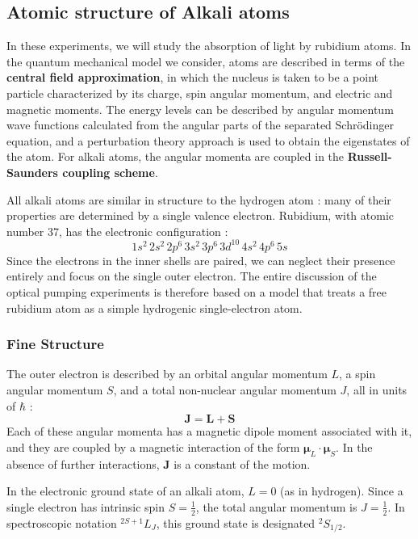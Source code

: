 \subsection{Atomic structure of Alkali atoms}
In these experiments, we will study the absorption of light by rubidium atoms. In the
quantum mechanical model we consider, atoms are described in terms of the
\textbf{central field approximation}, in which the nucleus is taken to be a point particle
characterized by its charge, spin angular momentum, and electric and magnetic moments.
The energy levels can be described by angular momentum wave functions calculated from
the angular parts of the separated Schr\"{o}dinger equation, and a perturbation theory
approach is used to obtain the eigenstates of the atom. For alkali atoms, the angular
momenta are coupled in the \textbf{Russell-Saunders coupling scheme}.
 
All alkali atoms are similar in structure to the hydrogen atom : many of their properties are
determined by a single valence electron. Rubidium, with atomic number 37, has the
electronic configuration :
\begin{equation}
    1s^2\,2s^2\,2p^6\,3s^2\,3p^6\,3d^{10}\,4s^2\,4p^6\,5s
\end{equation}
Since the electrons in the inner shells are paired, we can neglect their presence entirely and
focus on the single outer electron. The entire discussion of the optical pumping experiments
is therefore based on a model that treats a free rubidium atom as a simple hydrogenic
single-electron atom.
 
\subsubsection*{Fine Structure}
 
The outer electron is described by an orbital angular momentum $L$, a spin angular
momentum $S$, and a total non-nuclear angular momentum $J$, all in units of $\hbar$ :
\begin{equation}
    \mathbf{J} = \mathbf{L} + \mathbf{S}
\end{equation}
Each of these angular momenta has a magnetic dipole moment associated with it, and they
are coupled by a magnetic interaction of the form $\boldsymbol{\mu}_L \cdot \boldsymbol{\mu}_S$.
In the absence of further interactions, $\mathbf{J}$ is a constant of the motion.
 
In the electronic ground state of an alkali atom, $L = 0$ (as in hydrogen). Since a single
electron has intrinsic spin $S = \tfrac{1}{2}$, the total angular momentum is $J = \tfrac{1}{2}$.
In spectroscopic notation $^{2S+1}L_J$, this ground state is designated $^2S_{1/2}$.
 
